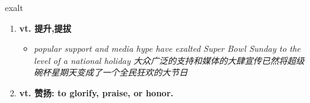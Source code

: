 
\begin{frame}
{\huge exalt}
\begin{center}
\begin{enumerate}\Large
  \item \textbf{vt. 提升,提拔}
  \begin{itemize}
    \item \em{\Large{popular support and media hype have exalted Super Bowl Sunday to the level of a national holiday 大众广泛的支持和媒体的大肆宣传已然将超级碗杯星期天变成了一个全民狂欢的大节日}}
  \end{itemize}
  \item \textbf{vt. 赞扬: to glorify, praise, or honor.}
\end{enumerate}
\end{center}
\end{frame}
